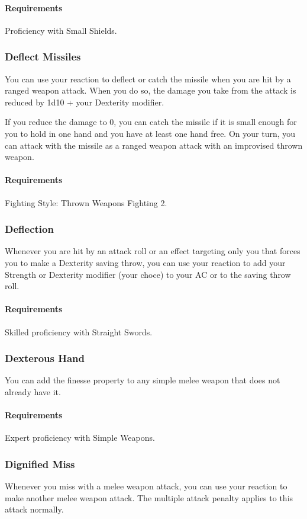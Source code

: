     \paragraph{Requirements} Proficiency with Small Shields.
\subsubsection{Deflect Missiles} \label{feat::deflectmissiles}
    You can use your reaction to deflect or catch the missile when you are hit by a ranged weapon attack.
    When you do so, the damage you take from the attack is reduced by 1d10 + your Dexterity modifier.

    If you reduce the damage to 0, you can catch the missile if it is small enough for you to hold in one hand and you have at least one hand free.
    On your turn, you can attack with the missile as a ranged weapon attack with an improvised thrown weapon.
    \paragraph{Requirements} Fighting Style: Thrown Weapons Fighting 2.
\subsubsection{Deflection} \label{feat::deflection}
    Whenever you are hit by an attack roll or an effect targeting only you that forces you to make a Dexterity saving throw, you can use your reaction to add your Strength or Dexterity modifier (your choce) to your AC or to the saving throw roll.
    \paragraph{Requirements} Skilled proficiency with Straight Swords.
\subsubsection{Dexterous Hand} \label{feat::dexteroushand}
    You can add the finesse property to any simple melee weapon that does not already have it.
    \paragraph{Requirements} Expert proficiency with Simple Weapons.
\subsubsection{Dignified Miss} \label{feat::dignifiedmiss}
    Whenever you miss with a melee weapon attack, you can use your reaction to make another melee weapon attack.
    The multiple attack penalty applies to this attack normally.
